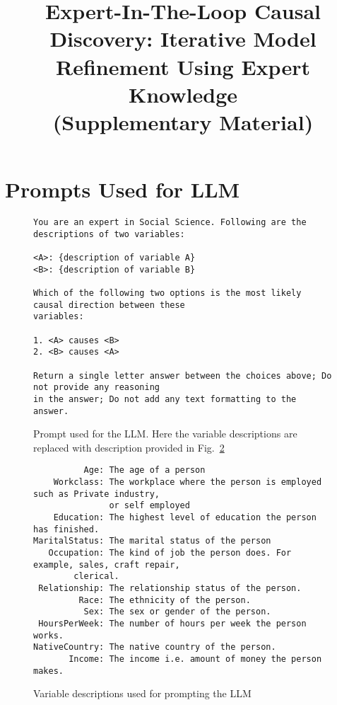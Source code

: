 \onecolumn
\title{Expert-In-The-Loop Causal Discovery: Iterative Model Refinement Using Expert Knowledge \\ (Supplementary Material)}
\maketitle
\appendix

\section{Prompts Used for LLM}
\label{section:llms}

\begin{figure}[ht!]
	\centering
	\begin{Verbatim}
You are an expert in Social Science. Following are the descriptions of two variables:

<A>: {description of variable A}
<B>: {description of variable B}

Which of the following two options is the most likely causal direction between these 
variables:

1. <A> causes <B>
2. <B> causes <A>

Return a single letter answer between the choices above; Do not provide any reasoning 
in the answer; Do not add any text formatting to the answer.
	\end{Verbatim}
	\caption{Prompt used for the LLM. Here the variable descriptions are replaced with description provided in Fig.~\ref{fig:var_description}}
	\label{fig:prompt}
\end{figure}

\begin{figure}[ht!]
	\begin{Verbatim}
          Age: The age of a person
    Workclass: The workplace where the person is employed such as Private industry, 
     	       or self employed
    Education: The highest level of education the person has finished.
MaritalStatus: The marital status of the person
   Occupation: The kind of job the person does. For example, sales, craft repair, 
   		clerical.
 Relationship: The relationship status of the person.
         Race: The ethnicity of the person.
          Sex: The sex or gender of the person.
 HoursPerWeek: The number of hours per week the person works.
NativeCountry: The native country of the person.
       Income: The income i.e. amount of money the person makes.
	\end{Verbatim}
	\caption{Variable descriptions used for prompting the LLM}
	\label{fig:var_description}
\end{figure}
